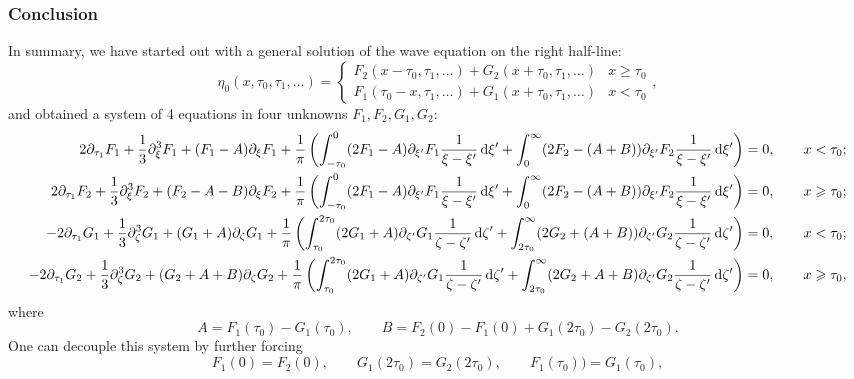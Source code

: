 \documentclass[10pt,reqno,oneside,a4paper, landscape]{article}
\begin{document}
\subsubsection{Conclusion}
In summary, we have started out with a general solution of the wave equation on the right half-line:
\[ \eta_0(x, \tau_0, \tau_1, \ldots ) = \begin{cases} F_2(x-\tau_0, \tau_1, \ldots ) + G_2(x+\tau_0, \tau_1, \ldots) & x\geq \tau_0 \\ F_1(\tau_0-x, \tau_1, \ldots ) + G_1(x+\tau_0, \tau_1, \ldots) & x<\tau_0 \end{cases}, \]
and obtained a system of 4 equations in four unknowns $F_1, F_2, G_1, G_2:$
\begin{equation}\label{HLSystem}
\begin{aligned}
2 \partial_{\tau_1}F_1 + \frac{1}{3} \partial_\xi^3 F_1 + (F_1-A)\partial_\xi F_1 + \frac{1}{\pi} \left(\int^0_{-\tau_0} (2 F_1  - A)\partial_{\xi'} F_1\frac{1}{\xi -\xi'} \,\mathrm{d} \xi' + \int^{\infty}_{0} (2 F_2 - (A+B))\partial_{\xi'} F_2 \frac{1}{\xi -\xi'} \,\mathrm{d} \xi'\right)  &= 0, \qquad x < \tau_0; \\
2 \partial_{\tau_1}F_2 + \frac{1}{3} \partial_\xi^3 F_2 + (F_2-A-B)\partial_\xi F_2 + \frac{1}{\pi}  \left( \int^0_{-\tau_0} (2 F_1 -A)\partial_{\xi'}F_1\frac{1}{\xi -\xi'} \,\mathrm{d} \xi' + \int^{\infty}_{0} (2 F_2 -  (A+B))\partial_{\xi'} F_2 \frac{1}{\xi -\xi'} \,\mathrm{d} \xi'  \right) &= 0, \qquad x \geqslant \tau_0; \\
- 2 \partial_{\tau_1} G_1 +  \frac{1}{3} \partial_\zeta^3 G_1+ (G_1+A) \partial_{\zeta} G_1  +  \frac{1}{\pi} \left( \int^{2\tau_0}_{\tau_0} (2 G_1 + A) \partial_{\zeta'} G_1 \frac{1}{\zeta -\zeta'} \,\mathrm{d} \zeta' + \int^{\infty}_{2\tau_0} (2 G_2+(A+B)) \partial_{\zeta'} G_2 \frac{1}{\zeta -\zeta'} \,\mathrm{d} \zeta' \right) &= 0, \qquad x < \tau_0; \\
- 2 \partial_{\tau_1} G_2 +  \frac{1}{3} \partial_\zeta^3 G_2+ (G_2+ A +B)\partial_{\zeta} G_2  + \frac{1}{\pi}  \left( \int^{2\tau_0}_{\tau_0} (2 G_1 +A)\partial_{\zeta'} G_1 \frac{1}{\zeta -\zeta'} \,\mathrm{d} \zeta' + \int^{\infty}_{2\tau_0} (2 G_2+A+B) \partial_{\zeta'} G_2 \frac{1}{\zeta -\zeta'} \,\mathrm{d} \zeta' \right) &= 0, \qquad x \geqslant \tau_0,
\end{aligned}
\end{equation}
where 
\[ A = F_1(\tau_0)  - G_1(\tau_0), \qquad B = F_2(0) - F_1(0)  +  G_1(2\tau_0) - G_2(2\tau_0). \]
One can decouple this system by further forcing 
\[
F_1(0) = F_2(0), \qquad G_1(2\tau_0) =G_2(2\tau_0), \qquad F_1(\tau_0) ) = G_1(\tau_0),
\]
\end{document}
